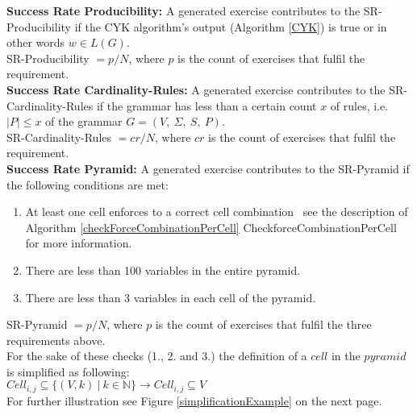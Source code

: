 \noindent\textbf{Success Rate Producibility: }
A generated exercise contributes to the SR-Producibility if the CYK algorithm's output (Algorithm \ref{CYK}) is true or in other words $w\in L(G)$.\\
SR-Producibility $ = p / N$, where $p$ is the count of exercises that fulfil the requirement.\\

\noindent\textbf{Success Rate Cardinality-Rules: }
A generated exercise contributes to the SR-Cardinality-Rules if the grammar has less than a certain count $x$ of rules, i.e. $|P|\leq x$ of the grammar $G=(V,\ \Sigma,\ S,\ P)$.\\
SR-Cardinality-Rules $ = cr / N$, where $cr$ is the count of exercises that fulfil the requirement.\\

\noindent\textbf{Success Rate Pyramid: }
A generated exercise contributes to the SR-Pyramid if the following conditions are met:
\begin{enumerate} [noitemsep]
	\item At least one cell enforces to a correct cell combination \textendash~see the description of Algorithm \ref{checkForceCombinationPerCell} CheckforceCombinationPerCell for more information.
	\item There are less than 100 variables in the entire pyramid.
	\item There are less than 3 variables in each cell of the pyramid.
\end{enumerate}
SR-Pyramid $= p / N$, where $p$ is the count of exercises that fulfil the three requirements above. \\

\noindent For the sake of these checks (1., 2. and 3.) the definition of a $cell$ in the $pyramid$ is simplified as following:\\ 
$Cell_{i,j} \subseteq \{(V,k)~|~k \in \mathbb{N} \} \longrightarrow Cell_{i,j} \subseteq V$\\
For further illustration see Figure \ref{simplificationExample} on the next page. 
\clearpage


